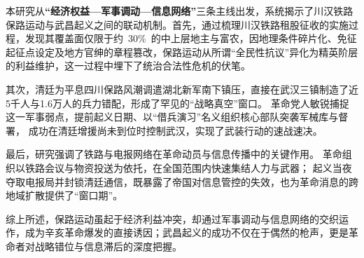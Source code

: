 本研究从\textbf{“经济权益—军事调动—信息网络”}三条主线出发，系统揭示了川汉铁路保路运动与武昌起义之间的联动机制。首先，通过梳理川汉铁路租股征收的实施过程，发现其覆盖面仅限于约 30\% 的中上层地主与富农，因地理条件碎片化、免征起征点设定及地方官绅的章程篡改，保路运动从所谓“全民性抗议”异化为精英阶层的利益维护，这一过程中埋下了统治合法性危机的伏笔。

其次，清廷为平息四川保路风潮调遣湖北新军南下镇压，直接在武汉三镇制造了近5千人与1.6万人的兵力错配，形成了罕见的“战略真空”窗口。
革命党人敏锐捕捉这一军事弱点，提前起义日期、以“借兵演习”名义组织核心部队突袭军械库与督署，
成功在清廷增援尚未到位时控制武汉，实现了武装行动的速战速决。

最后，研究强调了铁路与电报网络在革命动员与信息传播中的关键作用。
革命组织以铁路会议与物资投送为依托，在全国范围内快速集结人力与武器；
起义当夜夺取电报局并封锁清廷通信，既暴露了帝国对信息管控的失效，也为革命消息的跨地域扩散提供了“窗口期”。

综上所述，保路运动虽起于经济利益冲突，却通过军事调动与信息网络的交织运作，成为辛亥革命爆发的直接诱因；武昌起义的成功不仅在于偶然的枪声，更是革命者对战略错位与信息滞后的深度把握。